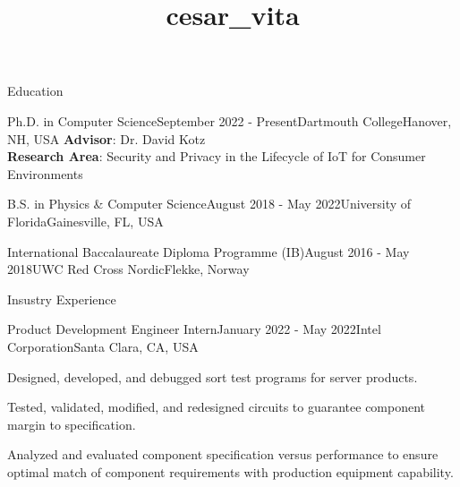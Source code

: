 \documentclass{resume} %
\begin{document}
\title{cesar_vita}

\begin{rSection}{Education}

\begin{rSubsection}{Ph.D. in Computer Science}{September 2022 - Present}{Dartmouth College}{Hanover, NH, USA}
  \vspace{-.1cm}
  \textbf{Advisor}: Dr. David Kotz\\ \textbf{Research Area}: Security and Privacy in the Lifecycle of IoT for Consumer
Environments
  \vspace{-.65cm}
  \item[]
\end{rSubsection}

\begin{rSubsection}{B.S. in Physics \& Computer Science}{August 2018 - May 2022}{University of Florida}{Gainesville, FL, USA}
  \vspace{-.65cm}
  \item[]
\end{rSubsection}

\begin{rSubsection}{International Baccalaureate Diploma Programme (IB)}{August 2016 - May 2018}{UWC Red Cross Nordic}{Flekke, Norway}
  \vspace{-.65cm}
  \item[]
\end{rSubsection}
\end{rSection}


\begin{rSection}{Insustry Experience}
\begin{rSubsection}{Product Development Engineer Intern}{January 2022 - May 2022}{Intel Corporation}{Santa Clara, CA, USA}
  \item Designed, developed, and debugged sort test programs for server products. 
  \item Tested, validated, modified, and redesigned circuits to guarantee component margin to
specification. 
  \item Analyzed and evaluated component specification versus performance to ensure optimal
match of component requirements with production equipment capability.
\end{rSubsection}
\end{rSection}
\end{document}
